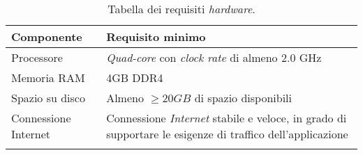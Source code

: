\begin{longtable}{|l|p{}|}
	\hline
	\textbf{Componente}       & \textbf{ Requisito minimo}   \\
	\hline
     Processore             &  \textit{Quad-core} con \textit{clock rate} di almeno 2.0 GHz      \\
    \hline
     Memoria RAM            &  4GB DDR4       \\
    \hline
    Spazio su disco         &  Almeno $ \geq  20 GB$ di spazio disponibili        \\
    \hline
    Connessione Internet         & Connessione \textit{Internet} stabile e veloce, in grado di supportare le esigenze di traffico dell'applicazione         \\
    \hline

    \caption{Tabella dei requisiti \textit{hardware}.}
\end{longtable}
